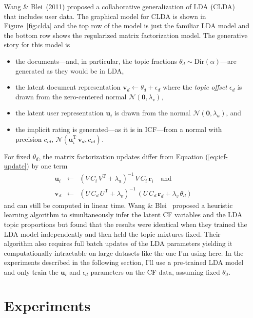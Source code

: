 \documentclass[11pt]{article}
\newcommand{\eq}[1]{Equation (\ref{eq:#1})}
\newcommand{\eqlabel}[1]{\label{eq:#1}}
\newcommand{\fig}[1]{Figure~\ref{fig:#1}}
\begin{document}
Wang \& Blei~(2011) proposed a collaborative generalization of LDA (CLDA) that
includes user data.
The graphical model for CLDA is shown in \fig{clda} and the top row of the
model is just the familiar LDA model and the bottom row shows the regularized
matrix factorization model.
The generative story for this model is
\begin{itemize}
\item{the documents---and, in particular, the topic fractions $\theta_d \sim
\mathrm{Dir}(\alpha)$---are generated as they would be in LDA,}
\item{the latent document representation $\mathbf{v}_d \gets \theta_d +
\epsilon_d$ where the \emph{topic offset} $\epsilon_d$ is drawn from the
zero-centered normal $\mathcal{N} (\mathbf{0},\lambda_v)$,}
\item{the latent user representation $\mathbf{u}_i$ is drawn from the normal
$\mathcal{N}(\mathbf{0},\lambda_u)$, and}
\item{the implicit rating is generated---as it is in ICF---from a normal with
precision $c_{id}$,
$\mathcal{N}(\mathbf{u}_i^\mathrm{T}\,\mathbf{v}_d,c_{id})$.}
\end{itemize}

For fixed $\theta_d$, the matrix factorization updates differ from
\eq{icf-update} by one term \cite{ctr}
\begin{eqnarray}\eqlabel{clda-update}
\mathbf{u}_i &\gets& (V\,C_i\,V^\mathrm{T}+\lambda_u)^{-1}\,
                     V\,C_i\,\mathbf{r}_i
\quad \mathrm{and} \\
\mathbf{v}_d &\gets& (U\,C_d\,U^\mathrm{T} + \lambda_v)^{-1}\,(U\,C_d\,
                     \mathbf{r}_d + \lambda_v\,\theta_d) \quad \nonumber
\end{eqnarray}
and can still be computed in linear time.
Wang \& Blei~ proposed a heuristic learning algorithm to
simultaneously infer the latent CF variables and the LDA topic proportions but
found that the results were identical when they trained the LDA model
independently and then held the topic mixtures fixed.
Their algorithm also requires full batch updates of the LDA parameters
yielding it computationally intractable on large datasets like the one I'm
using here.
In the experiments described in the following section, I'll use a pre-trained
LDA model and only train the $\mathbf{u}_i$ and $\epsilon_d$ parameters on the
CF data, assuming fixed $\theta_d$.

\section{Experiments}
\end{document}
